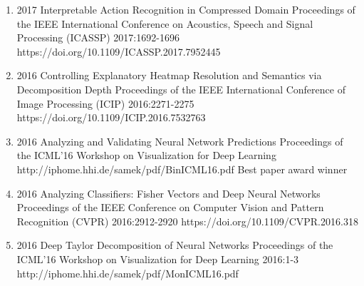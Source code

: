 \documentclass[10pt,a4paper]{article} %
\begin{document}
{\begin{enumerate}
        \item {}
                                {2017}
                                {Interpretable Action Recognition in Compressed Domain}
                                {Proceedings of the IEEE International Conference on Acoustics, Speech and Signal Processing (ICASSP)}
                                {2017:1692-1696}
                                {https://doi.org/10.1109/ICASSP.2017.7952445}


        \item {}
                                {2016}
                                {Controlling Explanatory Heatmap Resolution and Semantics via Decomposition Depth}
                                {Proceedings of the IEEE International Conference of Image Processing (ICIP)}
                                {2016:2271-2275}
                                {https://doi.org/10.1109/ICIP.2016.7532763}


        \item {}
                                {2016}
                                {Analyzing and Validating Neural Network Predictions}
                                {Proceedings of the ICML'16 Workshop on Visualization for Deep Learning}
                                {}
                                {http://iphome.hhi.de/samek/pdf/BinICML16.pdf}
                                {Best paper award winner}

        \item {}
                                {2016}
                                {Analyzing Classifiers: Fisher Vectors and Deep Neural Networks}
                                {Proceedings of the IEEE Conference on Computer Vision and Pattern Recognition (CVPR)}
                                {2016:2912-2920}
                                {https://doi.org/10.1109/CVPR.2016.318}

        \item {}
                                {2016}
                                {Deep Taylor Decomposition of Neural Networks}
                                {Proceedings of the ICML'16 Workshop on Visualization for Deep Learning}
                                {2016:1-3}
                                {http://iphome.hhi.de/samek/pdf/MonICML16.pdf}


\end{enumerate}}
\end{document}
